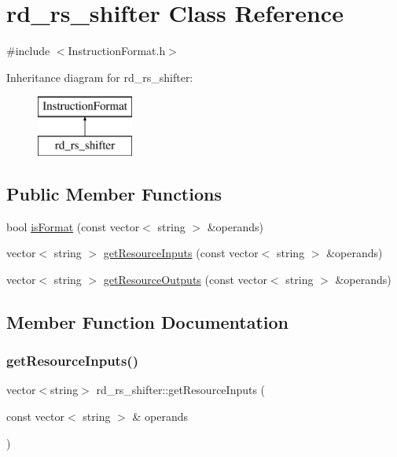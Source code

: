 \hypertarget{classrd__rs__shifter}{}\section{rd\+\_\+rs\+\_\+shifter Class Reference}
\label{classrd__rs__shifter}


{\ttfamily \#include $<$Instruction\+Format.\+h$>$}

Inheritance diagram for rd\+\_\+rs\+\_\+shifter\+:\begin{figure}[H]
\begin{center}
\leavevmode
\includegraphics[height=2.000000cm]{classrd__rs__shifter}
\end{center}
\end{figure}
\subsection*{Public Member Functions}
\begin{DoxyCompactItemize}
\item 
bool \hyperlink{classrd__rs__shifter_a78e9526cc76d33f8dbfe614733ee3564}{is\+Format} (const vector$<$ string $>$ \&operands)
\item 
vector$<$ string $>$ \hyperlink{classrd__rs__shifter_ae52cf6e9a846ab34fd0d248c9c4f9008}{get\+Resource\+Inputs} (const vector$<$ string $>$ \&operands)
\item 
vector$<$ string $>$ \hyperlink{classrd__rs__shifter_aed7186be3ead5fe24d6d63eacdf817bd}{get\+Resource\+Outputs} (const vector$<$ string $>$ \&operands)
\end{DoxyCompactItemize}


\subsection{Member Function Documentation}
\mbox{\label{classrd__rs__shifter_ae52cf6e9a846ab34fd0d248c9c4f9008}} 
\subsubsection{\texorpdfstring{get\+Resource\+Inputs()}{getResourceInputs()}}
{\footnotesize\ttfamily vector$<$string$>$ rd\+\_\+rs\+\_\+shifter\+::get\+Resource\+Inputs (\begin{DoxyParamCaption}\item[{const vector$<$ string $>$ \&}]{operands }\end{DoxyParamCaption})\hspace{0.3cm}{\ttfamily [virtual]}}

